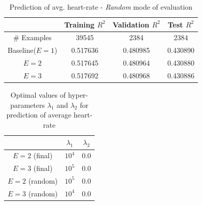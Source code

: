 \documentclass{acm_proc_article-sp}
\begin{document}
\begin{table}[h]
\centering
\begin{tabular}{|c|c|c|c|} \hline
& Training $R^2$ & Validation $R^2$ & Test $R^2$ \\ \hline
\# Examples & 39545 & 2384  &  2384 \\ \hline
Baseline($E = 1$) & 0.517636 & 0.480985 & 0.430890 \\ \hline
$E = 2$  & 0.517645 & 0.480964 & 0.430880 \\ \hline
$E = 3$  & 0.517692 & 0.480968 & 0.430886 \\ \hline
\end{tabular}
\caption{Prediction of avg. heart-rate - \emph{Random} mode of evaluation }
\label{tableAvgHrRandom}
\end{table}

\begin{table}[h]
\centering
\begin{tabular}{|c|c|c|} \hline
& $\lambda_1$ & $\lambda_2$ \\ \hline
$E = 2$ (final) & $10^4$ & $0.0$ \\ \hline
$E = 3$ (final) & $10^5$ & $0.0$ \\ \hline
$E = 2$ (random) & $10^5$ & $0.0$ \\ \hline
$E = 3$ (random) & $10^4$ & $0.0$ \\ \hline
\end{tabular}
\caption{Optimal values of hyper-parameters $\lambda_1$ and $\lambda_2$ for prediction of average heart-rate}
\label{tableAvgHrHyperparams}
\end{table}
\end{document}
